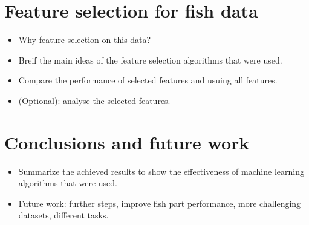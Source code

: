 \documentclass[runningheads]{llncs}
\begin{document}
\section{Feature selection for fish data}

\begin{itemize}
    \item Why feature selection on this data? 
    \item Breif the main ideas of the feature selection algorithms that were used. 
    \item Compare the performance of selected features and usuing all features. 
    \item (Optional): analyse the selected features. 
\end{itemize}

\section{Conclusions and future work}

\begin{itemize}
    \item Summarize the achieved results to show the effectiveness of machine learning algorithms that were used. 
    \item Future work: further steps, improve fish part performance, more challenging datasets, different tasks. 
\end{itemize}




\end{document}
